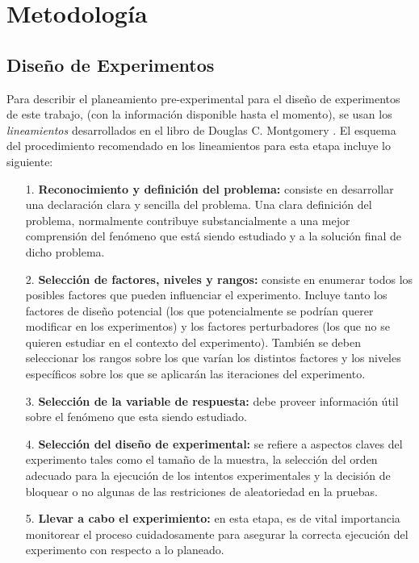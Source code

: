 \section{\textbf{Metodolog\'ia}}\label{metodologia}
\subsection{Dise\~no de Experimentos}
Para describir el planeamiento pre-experimental para el dise\~no de experimentos de este trabajo, (con la informaci\'on disponible hasta el momento), se usan los \textit{lineamientos} desarrollados en el libro de Douglas C. Montgomery \cite{montgomeryx}. El esquema del procedimiento recomendado en los lineamientos para esta etapa incluye lo siguiente:
\begin{itemize}
\item [1.] \textbf{Reconocimiento y definici\'on del problema:} consiste en desarrollar una declaraci\'on clara y sencilla del problema. Una clara definici\'on del problema, normalmente contribuye substancialmente a una mejor comprensi\'on del fen\'omeno que est\'a siendo estudiado y a la soluci\'on final de dicho problema.
\item [2.] \textbf{Selecci\'on de factores, niveles y rangos:} consiste en enumerar todos los posibles factores que pueden influenciar el experimento. Incluye tanto los factores de dise\~no potencial (los que potencialmente se podr\'ian querer modificar en los experimentos) y los factores perturbadores (los que no se quieren estudiar en el contexto del experimento). Tambi\'en se deben seleccionar los rangos sobre los que var\'ian los distintos factores y los niveles espec\'ificos sobre los que se aplicar\'an las iteraciones del experimento.
\item [3.] \textbf{Selecci\'on de la variable de respuesta:} debe proveer informaci\'on \'util sobre el fen\'omeno que esta siendo estudiado.
\item [4.] \textbf{Selecci\'on del dise\~no de experimental:} se refiere a aspectos claves del experimento tales como el tama\~no de la muestra, la selecci\'on del orden adecuado para la ejecuci\'on de los intentos experimentales y la decisi\'on de bloquear o no algunas de las restriciones de aleatoriedad en la pruebas.
\item [5.] \textbf{Llevar a cabo el experimiento:} en esta etapa, es de vital importancia monitorear el proceso cuidadosamente para asegurar la correcta ejecuci\'on del experimento con respecto a lo planeado.
\end{itemize}
